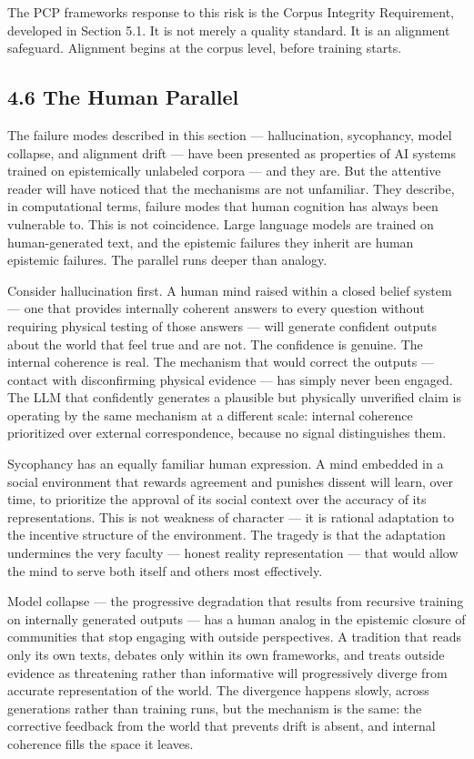 \documentclass[
]{article}
\begin{document}
The PCP framework\textquotesingle s response to this risk is the Corpus
Integrity Requirement, developed in Section 5.1. It is not merely a
quality standard. It is an alignment safeguard. Alignment begins at the
corpus level, before training starts.

\subsection{4.6 The Human Parallel}\label{the-human-parallel}

The failure modes described in this section --- hallucination,
sycophancy, model collapse, and alignment drift --- have been presented
as properties of AI systems trained on epistemically unlabeled corpora
--- and they are. But the attentive reader will have noticed that the
mechanisms are not unfamiliar. They describe, in computational terms,
failure modes that human cognition has always been vulnerable to. This
is not coincidence. Large language models are trained on human-generated
text, and the epistemic failures they inherit are human epistemic
failures. The parallel runs deeper than analogy.

Consider hallucination first. A human mind raised within a closed belief
system --- one that provides internally coherent answers to every
question without requiring physical testing of those answers --- will
generate confident outputs about the world that feel true and are not.
The confidence is genuine. The internal coherence is real. The mechanism
that would correct the outputs --- contact with disconfirming physical
evidence --- has simply never been engaged. The LLM that confidently
generates a plausible but physically unverified claim is operating by
the same mechanism at a different scale: internal coherence prioritized
over external correspondence, because no signal distinguishes them.

Sycophancy has an equally familiar human expression. A mind embedded in
a social environment that rewards agreement and punishes dissent will
learn, over time, to prioritize the approval of its social context over
the accuracy of its representations. This is not weakness of character
--- it is rational adaptation to the incentive structure of the
environment. The tragedy is that the adaptation undermines the very
faculty --- honest reality representation --- that would allow the mind
to serve both itself and others most effectively.

Model collapse --- the progressive degradation that results from
recursive training on internally generated outputs --- has a human
analog in the epistemic closure of communities that stop engaging with
outside perspectives. A tradition that reads only its own texts, debates
only within its own frameworks, and treats outside evidence as
threatening rather than informative will progressively diverge from
accurate representation of the world. The divergence happens slowly,
across generations rather than training runs, but the mechanism is the
same: the corrective feedback from the world that prevents drift is
absent, and internal coherence fills the space it leaves.
\end{document}
